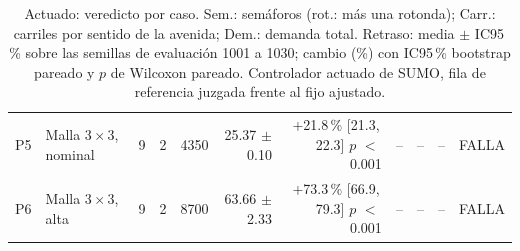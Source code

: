 \begin{table}[H]
\begin{tabular}{llcrrrrrrcl}
P5 & \makecell[l]{Malla $3 \times 3$,\\{}nominal} & 9 & 2 & 4350 & \makecell[r]{25.37\\{}$\pm$ 0.10} & \makecell[r]{+21.8\,\%\\{}[21.3,\,22.3]\\$p$ $<$\,0.001} & -- & -- & -- & FALLA \\
P6 & \makecell[l]{Malla $3 \times 3$,\\{}alta} & 9 & 2 & 8700 & \makecell[r]{63.66\\{}$\pm$ 2.33} & \makecell[r]{+73.3\,\%\\{}[66.9,\,79.3]\\$p$ $<$\,0.001} & -- & -- & -- & FALLA \\
\bottomrule
\end{tabular}
\caption[Veredicto del actuado]{Actuado: veredicto por caso. Sem.: semáforos (rot.: más una rotonda); Carr.: carriles por sentido de la avenida; Dem.: demanda total. Retraso: media $\pm$ IC95\,\% sobre las semillas de evaluación 1001 a 1030; cambio (\%) con IC95\,\% bootstrap pareado y $p$ de Wilcoxon pareado. Controlador actuado de SUMO, fila de referencia juzgada frente al fijo ajustado.}
\label{tab:veredicto-actuado}
\end{table}
